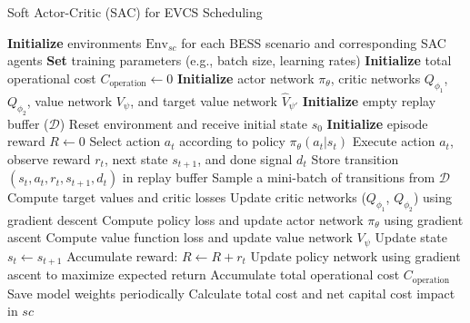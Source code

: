 \documentclass[10pt, journal]{IEEEtran}
\begin{document}
{
\setlength{\belowcaptionskip}{-25mm}
\begin{algorithm}[ht]
\caption{Soft Actor-Critic (SAC) for EVCS Scheduling}
\label{alg:sac}
\begin{algorithmic}[1]
\STATE \textbf{Initialize} environments $\text{Env}_{sc}$ for each BESS scenario and corresponding SAC agents
\STATE \textbf{Set} training parameters (e.g., batch size, learning rates)
    \STATE \textbf{Initialize} total operational cost $C_{\text{operation}} \leftarrow 0$
    \STATE \textbf{Initialize} actor network $\pi_\theta$, critic networks $Q_{\phi_1}$, $Q_{\phi_2}$, value network $V_{\psi}$, and target value network $\hat{V}_{\psi'}$
    \STATE \textbf{Initialize} empty replay buffer ($\mathcal{D}$)
        \STATE Reset environment and receive initial state $s_0$
        \STATE \textbf{Initialize} episode reward $R \leftarrow 0$
            \STATE Select action $a_t$ according to policy $\pi_\theta(a_t|s_t)$
            \STATE Execute action $a_t$, observe reward $r_t$, next state $s_{t+1}$, and done signal $d_t$
            \STATE Store transition $(s_t, a_t, r_t, s_{t+1}, d_t)$ in replay buffer
            \STATE Sample a mini-batch of transitions from $\mathcal{D}$
            \STATE Compute target values and critic losses
            \STATE Update critic networks ($Q_{\phi_1}$, $Q_{\phi_2}$) using gradient descent
            \STATE Compute policy loss and update actor network $\pi_\theta$ using gradient ascent
            \STATE Compute value function loss and update value network $V_{\psi}$
            \STATE Update state $s_t \leftarrow s_{t+1}$
            \STATE Accumulate reward: $R \leftarrow R + r_t$
            \STATE Update policy network using gradient ascent to maximize expected return
        \ENDWHILE
        \STATE Accumulate total operational cost $C_{\text{operation}}$
        \STATE Save model weights periodically
    \ENDFOR
    \STATE Calculate total cost and net capital cost impact in $sc$
\ENDFOR
\end{algorithmic}
\end{algorithm}}
\end{document}

